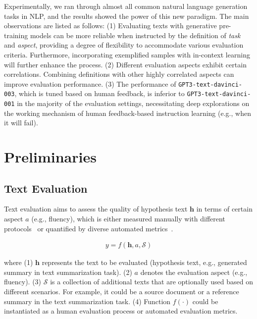 Experimentally, we ran through almost all common natural language generation tasks in NLP, and the results showed the power of this new paradigm. The main observations are listed as follows: (1) Evaluating texts with generative pre-training models can be more reliable when instructed by the definition of \textit{task} and \textit{aspect}, providing a degree of flexibility to accommodate various evaluation criteria. Furthermore, incorporating exemplified samples with in-context learning will further enhance the process. (2) Different evaluation aspects exhibit certain correlations. Combining definitions with other highly correlated aspects can improve evaluation performance. (3) The performance of \texttt{GPT3-text-davinci-003}, which is tuned based on human feedback, is inferior to \texttt{GPT3-text-davinci-001} in the majority of the evaluation settings, necessitating deep explorations on the working mechanism of human feedback-based instruction learning (e.g., when it will fail).

\section{Preliminaries}

\subsection{Text Evaluation} Text evaluation aims to assess the quality of hypothesis text $\bm{h}$ in terms of certain aspect $a$ (e.g., fluency), which is either measured manually with different protocols~\cite{nenkova-passonneau-2004-evaluating,realsumm2020manik,fabbri:summeval,liu2022revisiting} or quantified by diverse automated metrics~\cite{rouge2004lin,bleu2002kishore,moverscore2019wei,bertscore2020tianyi,bartscore2021yuan}.

\begin{align}
    y = f(\bm{h}, a, \mathcal{S})
\end{align}

where (1) $\bm{h}$ represents the text to be evaluated (hypothesis text, e.g., generated summary in text summarization task). (2) $a$ denotes the evaluation aspect (e.g., fluency). (3) $\mathcal{S}$ is a collection of additional texts that are optionally used based on different scenarios. For example, it could be a source document or a reference summary in the text summarization task. (4) Function $f(\cdot)$ could be instantiated as a human evaluation process or automated evaluation metrics.

